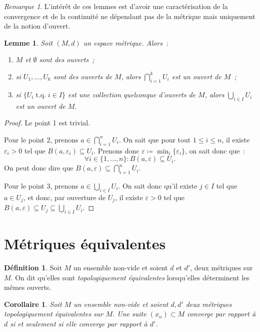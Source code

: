 \documentclass{report}
\newtheorem{lem}[thm]{Lemme}
\newtheorem{cor}[thm]{Corollaire}
\theoremstyle{definition}
\newtheorem{déf}[thm]{Définition}
\theoremstyle{remark}
\newtheorem*{rmq}{Remarque}
\DeclareMathOperator{\tq}{\text{ t.q. }}
\begin{document}
		\begin{rmq} L'intérêt de ces lemmes est d'avoir une caractérisation de la convergence et de la continuité ne dépendant pas de la métrique mais uniquement
		de la notion d'ouvert.
		\end{rmq}

		\begin{lem}\label{lem:espmetraxiomestop} Soit $(M, d)$ un espace métrique. Alors~:
		\begin{enumerate}
			\item $M$ et $\emptyset$ sont des ouverts~;
			\item si $U_1, \ldots, U_k$ sont des ouverts de $M$, alors $\bigcap_{i=1}^kU_i$ est un ouvert de $M$~;
			\item si $\{U_i \tq i \in I\}$ est une collection quelconque d'ouverts de $M$, alors $\bigcup_{i\in I}U_i$ est un ouvert de $M$.
		\end{enumerate}
		\end{lem}

		\begin{proof} Le point 1 est trivial.

		Pour le point 2, prenons $a \in \bigcap_{i=1}^nU_i$. On sait que pour tout $1 \leq i \leq n$, il existe $\varepsilon_i > 0$ tel que
		$B(a, \varepsilon_i) \subseteq U_i$. Prenons donc $\varepsilon \coloneqq \min_i\{\varepsilon_i\}$, on sait donc que~:
		\[\forall i \in \{1, \ldots, n\} : B(a, \varepsilon) \subseteq U_i.\]
		On peut donc dire que $B(a, \varepsilon) \subseteq \bigcap_{i=1}^nU_i$.

		Pour le point 3, prenons $a \in \bigcup_{i\in I}U_i$. On sait donc qu'il existe $j \in I$ tel que $a \in U_j$, et donc, par ouverture de $U_j$, il existe
		$\varepsilon > 0$ tel que $B(a, \varepsilon) \subseteq U_j \subseteq \bigcup_{i\in I}U_i$.
		\end{proof}

	\section{Métriques équivalentes}
		\begin{déf} Soit $M$ un ensemble non-vide et soient $d$ et $d'$, deux métriques sur $M$. On dit qu'elles sont \textit{topologiquement équivalentes} lorsqu'elles
		déterminent les mêmes ouverts.
		\end{déf}

		\begin{cor} Soit $M$ un ensemble non-vide et soient $d, d'$ deux métriques topologiquement équivalentes sur $M$. Une suite $(x_n) \subset M$ converge par
		rapport à $d$ si et seulement si elle converge par rapport à $d'$.
		\end{cor}
\end{document}
